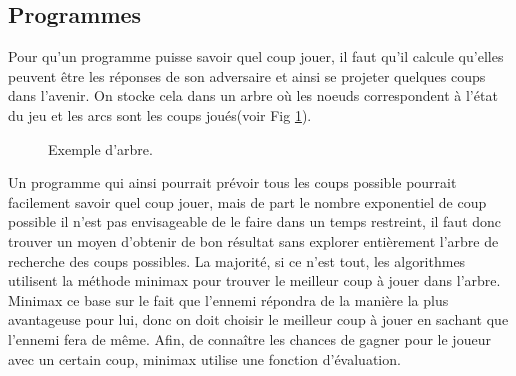 \documentclass[10pt,a4paper]{article}
\begin{document}
\subsection{Programmes}
Pour qu'un programme puisse savoir quel coup jouer, il faut qu'il calcule qu'elles peuvent être les réponses de son adversaire et ainsi se projeter quelques coups dans l'avenir. On stocke cela dans un arbre où les noeuds correspondent à l'état du jeu et les arcs sont les coups joués(voir Fig \ref{fig:exemple_arbre}).
  \begin{figure}[H]    
    \centering
     \caption {Exemple d'arbre.\label{fig:exemple_arbre} }
 \end{figure}
  Un programme qui ainsi pourrait prévoir tous les coups possible pourrait facilement savoir quel coup jouer, mais de part le nombre exponentiel de coup possible il n'est pas envisageable de le faire dans un temps restreint, il faut donc trouver un moyen d'obtenir de bon résultat sans explorer entièrement l'arbre de recherche des coups possibles.\newline
  La majorité, si ce n'est tout, les algorithmes utilisent la méthode minimax pour trouver le meilleur coup à jouer dans l'arbre. Minimax ce base sur le fait que l'ennemi répondra de la manière la plus avantageuse pour lui, donc on doit choisir le meilleur coup à jouer en sachant que l'ennemi fera de même. Afin, de connaître les chances de gagner pour le joueur avec un certain coup, minimax utilise une fonction d'évaluation.
\end{document}

